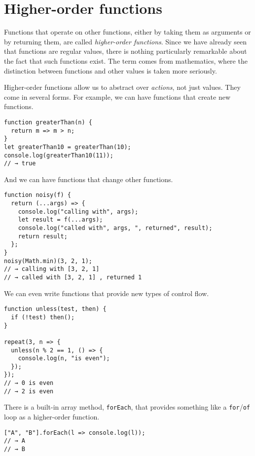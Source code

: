 \section{Higher-order functions}

Functions that operate on other functions, either by taking them as arguments or by returning them, are called \emph{higher-order functions}. Since we have already seen that functions are regular values, there is nothing particularly remarkable about the fact that such functions exist. The term comes from mathematics, where the distinction between functions and other values is taken more seriously.

Higher-order functions allow us to abstract over \emph{actions}, not just values. They come in several forms. For example, we can have functions that create new functions.

\begin{lstlisting}
function greaterThan(n) {
  return m => m > n;
}
let greaterThan10 = greaterThan(10);
console.log(greaterThan10(11));
// → true
\end{lstlisting}
\noindent

And we can have functions that change other functions.

\begin{lstlisting}
function noisy(f) {
  return (...args) => {
    console.log("calling with", args);
    let result = f(...args);
    console.log("called with", args, ", returned", result);
    return result;
  };
}
noisy(Math.min)(3, 2, 1);
// → calling with [3, 2, 1]
// → called with [3, 2, 1] , returned 1
\end{lstlisting}
\noindent

We can even write functions that provide new types of control
flow.

\begin{lstlisting}
function unless(test, then) {
  if (!test) then();
}

repeat(3, n => {
  unless(n % 2 == 1, () => {
    console.log(n, "is even");
  });
});
// → 0 is even
// → 2 is even
\end{lstlisting}
\noindent{}

There is a built-in array method, \lstinline`forEach`, that provides something like a \lstinline`for`/\lstinline`of` loop as a higher-order function.

\begin{lstlisting}
["A", "B"].forEach(l => console.log(l));
// → A
// → B
\end{lstlisting}
\noindent

